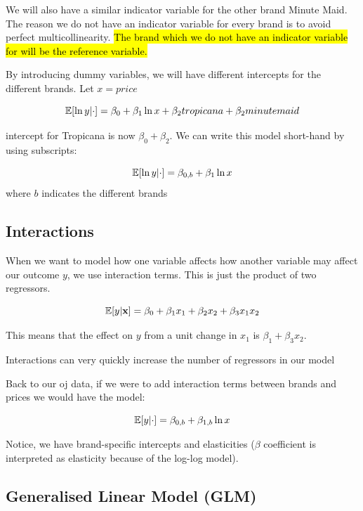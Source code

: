 \documentclass[11pt]{article}
\begin{document}
We will also have a similar indicator variable for the other brand Minute Maid. The reason we do not have an indicator variable for every brand is to avoid perfect multicollinearity. \hl{The brand which we do not have an indicator variable for will be the reference variable.}

By introducing dummy variables, we will have different intercepts for the different brands. Let $x = price$

$$
\mathbb{E}[\ln y| \cdot] = \beta_0 + \beta_1 \ln x + \beta_2 tropicana + \beta_2 minutemaid
$$

intercept for Tropicana is now $\beta_0 + \beta_2$. We can write this model short-hand by using subscripts:

\begin{equation*}
    \mathbb{E}[\ln y|\cdot] = \beta_{0,b} + \beta_1 \ln x
\end{equation*}
where $b$ indicates the different brands

\subsection{Interactions}

When we want to model how one variable affects how another variable may affect our outcome $y$, we use interaction terms. This is just the product of two regressors.

\begin{equation}
    \label{eq:interaction}
    \mathbb{E}[y|\mathbf{x}] = \beta_0 + \beta_1 x_1 + \beta_2 x_2 + \beta_3 x_1 x_2
\end{equation}

This means that the effect on $y$ from a unit change in $x_1$ is $\beta_1 + \beta_3 x_2$. 

\begin{note}
    Interactions can very quickly increase the number of regressors in our model
\end{note}

Back to our oj data, if we were to add interaction terms between brands and prices we would have the model:

\begin{equation*}
    \mathbb{E}[y|\cdot] = \beta_{0,b} + \beta_{1,b} \ln x
\end{equation*}

Notice, we have brand-specific intercepts and elasticities ($\beta$ coefficient is interpreted as elasticity because of the log-log model).

\subsection{Generalised Linear Model (GLM)}
\end{document}
